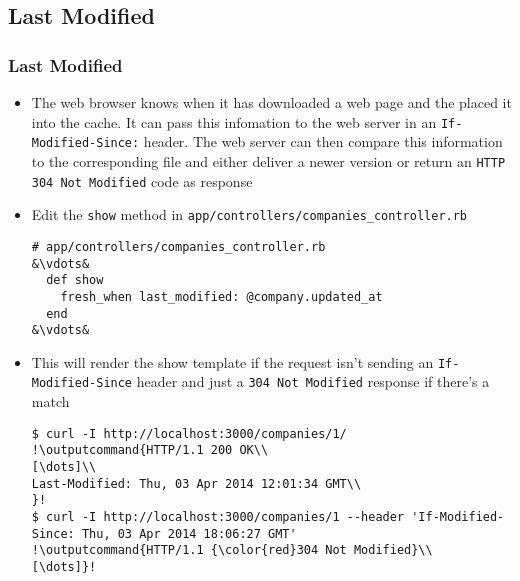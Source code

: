\documentclass{beamer}
\newcommand{\outputcommand}[1]{\color{darkgreen}{#1}}
\begin{document}
\subsection{Last Modified}
\begin{frame}
\frametitle{Last Modified}
\begin{itemize}
\item The web browser knows when it has downloaded a web page and the placed it into the cache. It can pass this infomation to the web server in an \texttt{If-Modified-Since:} header. The web server can then compare this information to the corresponding file and either deliver a newer version or return an \texttt{HTTP 304 Not Modified} code as response

\item Edit the \texttt{show} method in \texttt{app/controllers/companies\_controller.rb}

\lstset{language=Ruby, style=eclipse}
\begin{lstlisting}[escapechar=&]
# app/controllers/companies_controller.rb
&\vdots&
  def show
    fresh_when last_modified: @company.updated_at
  end
&\vdots&
\end{lstlisting}

\item This will render the show template if the request isn’t sending an \texttt{If-Modified-Since} header and just a \texttt{304 Not Modified} response if there’s a match

\lstset{language=shell}
\begin{lstlisting}[escapechar=!]
$ curl -I http://localhost:3000/companies/1/
!\outputcommand{HTTP/1.1 200 OK\\
[\dots]\\
Last-Modified: Thu, 03 Apr 2014 12:01:34 GMT\\
}!
$ curl -I http://localhost:3000/companies/1 --header 'If-Modified-Since: Thu, 03 Apr 2014 18:06:27 GMT'
!\outputcommand{HTTP/1.1 {\color{red}304 Not Modified}\\
[\dots]}!
\end{lstlisting}
\end{itemize}
\end{frame}
\end{document}
